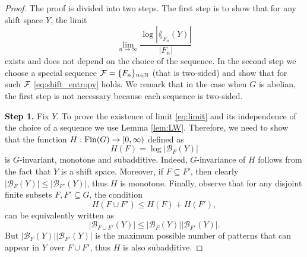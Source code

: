 \begin{proof}
The proof is divided into two steps. 
The first step is to show that for any shift space $Y$, the limit
\begin{equation}\label{eq:limit}
\lim_{n\to\infty}\frac{\log|\lang_{F_n}(Y)|}{|F_n|}
\end{equation}
exists and does not depend on the choice of the \Folner sequence. 
In the second step we choose a special \Folner sequence $\operatorname{\mathcal{F}}= \{F_n\}_{n\in\mathbb{N}}$ (that is two-sided) and show that for such $\operatorname{\mathcal{F}}$ \eqref{eq:shift_entropy} holds. We remark that in the case when $G$ is abelian, the first step is not necessary because each \Folner sequence is two-sided. 

\noindent
{\bf Step 1.}
Fix $Y$.
To prove the existence of limit \eqref{eq:limit} and its independence of the choice of a \Folner sequence we use Lemma \ref{lem:LW}.
Therefore, we need to show that the function $H:\operatorname{Fin}(G) \to [0,\infty)$ defined as 
\[
H( F)= \log|\mathcal B_F(Y)|
\]
is $G$-invariant, monotone and subadditive.
Indeed, $G$-invariance of $H$ follows from the fact that $Y$ is a shift space. Moreover, if $F\subseteq F'$, then clearly $|\mathcal B_F(Y)|\leq |\mathcal B_{F'}(Y)|$, thus $H$ is monotone. Finally, observe that for any disjoint finite subsets $F,F'\subseteq G$, the condition 
\[
H(F\cup F')\leq H(F)+H(F'),
\]
can be equivalently written as
\[
|\mathcal B_{F\cup F'}(Y)|\leq |\mathcal B_F(Y)||\mathcal B_{F'}(Y)|.
\]
But $|\mathcal B_F(Y)||\mathcal B_{F'}(Y)|$ is the maximum possible number of patterns that can appear in $Y$ over $F\cup F'$, thus $H$ is also subadditive.


\end{proof}
